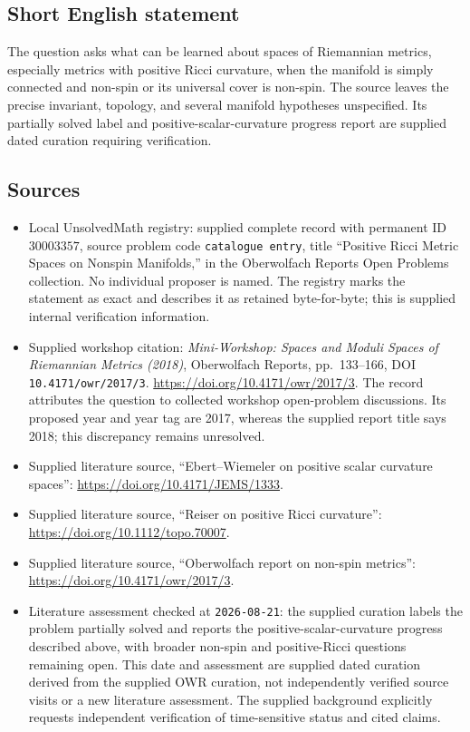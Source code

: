 \documentclass[11pt]{article}
\begin{document}
\subsection{Short English statement}
The question asks what can be learned about spaces of Riemannian metrics, especially metrics with positive Ricci curvature, when the manifold is simply connected and non-spin or its universal cover is non-spin. The source leaves the precise invariant, topology, and several manifold hypotheses unspecified. Its partially solved label and positive-scalar-curvature progress report are supplied dated curation requiring verification.
\subsection{Sources}
\begin{itemize}
\item Local UnsolvedMath registry: supplied complete record with permanent ID \(30003357\), source problem code \texttt{catalogue entry}, title ``Positive Ricci Metric Spaces on Nonspin Manifolds,'' in the Oberwolfach Reports Open Problems collection. No individual proposer is named. The registry marks the statement as exact and describes it as retained byte-for-byte; this is supplied internal verification information.
\item Supplied workshop citation: \emph{Mini-Workshop: Spaces and Moduli Spaces of Riemannian Metrics (2018)}, Oberwolfach Reports, pp.\ 133--166, DOI \texttt{10.4171/owr/2017/3}. \url{https://doi.org/10.4171/owr/2017/3}. The record attributes the question to collected workshop open-problem discussions. Its proposed year and year tag are 2017, whereas the supplied report title says 2018; this discrepancy remains unresolved.
\item Supplied literature source, ``Ebert--Wiemeler on positive scalar curvature spaces'': \url{https://doi.org/10.4171/JEMS/1333}.
\item Supplied literature source, ``Reiser on positive Ricci curvature'': \url{https://doi.org/10.1112/topo.70007}.
\item Supplied literature source, ``Oberwolfach report on non-spin metrics'': \url{https://doi.org/10.4171/owr/2017/3}.
\item Literature assessment checked at \texttt{2026-08-21}: the supplied curation labels the problem partially solved and reports the positive-scalar-curvature progress described above, with broader non-spin and positive-Ricci questions remaining open. This date and assessment are supplied dated curation derived from the supplied OWR curation, not independently verified source visits or a new literature assessment. The supplied background explicitly requests independent verification of time-sensitive status and cited claims.
\end{itemize}
\end{document}
